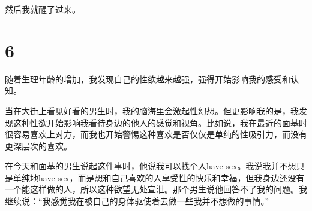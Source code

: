 然后我就醒了过来。


\section*{6}

随着生理年龄的增加，我发现自己的性欲越来越强，强得开始影响我的感受和认知。

当在大街上看见好看的男生时，我的脑海里会激起性幻想。但更影响我的是，我发现这种性欲开始影响我看待身边的他人的感觉和视角。比如说，我在最近的面基时很容易喜欢上对方，而我也开始警惕这种喜欢是否仅仅是单纯的性吸引力，而没有更深层次的喜欢。

在今天和面基的男生说起这件事时，他说我可以找个人have sex。我说我并不想只是单纯地have sex，而是想和自己喜欢的人享受性的快乐和幸福，但我身边还没有一个能这样做的人，所以这种欲望无处宣泄。那个男生说他回答不了我的问题。我继续说：“我感觉我在被自己的身体驱使着去做一些我并不想做的事情。”

